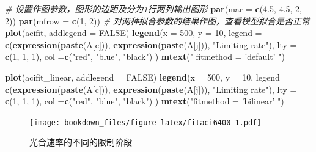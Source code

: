 \documentclass[]{krantz}
\makeatletter
\newenvironment{Shaded}{\begin{snugshade}}{\end{snugshade}}
\newcommand{\KeywordTok}[1]{\textcolor[rgb]{0.13,0.29,0.53}{\textbf{#1}}}
\newcommand{\DataTypeTok}[1]{\textcolor[rgb]{0.13,0.29,0.53}{#1}}
\newcommand{\DecValTok}[1]{\textcolor[rgb]{0.00,0.00,0.81}{#1}}
\newcommand{\FloatTok}[1]{\textcolor[rgb]{0.00,0.00,0.81}{#1}}
\newcommand{\StringTok}[1]{\textcolor[rgb]{0.31,0.60,0.02}{#1}}
\newcommand{\CommentTok}[1]{\textcolor[rgb]{0.56,0.35,0.01}{\textit{#1}}}
\newcommand{\OtherTok}[1]{\textcolor[rgb]{0.56,0.35,0.01}{#1}}
\newcommand{\NormalTok}[1]{#1}
\newenvironment{kframe}{%
\medskip{}
\setlength{\fboxsep}{.8em}
 \def\at@end@of@kframe{}%
 \ifinner\ifhmode%
  \def\at@end@of@kframe{\end{minipage}}%
  \begin{minipage}{\columnwidth}%
 \fi\fi%
 \def\FrameCommand##1{\hskip\@totalleftmargin \hskip-\fboxsep
 \colorbox{shadecolor}{##1}\hskip-\fboxsep
     \hskip-\linewidth \hskip-\@totalleftmargin \hskip\columnwidth}%
 \MakeFramed {\advance\hsize-\width
   \@totalleftmargin\z@ \linewidth\hsize
   \@setminipage}}%
 {\par\unskip\endMakeFramed%
 \at@end@of@kframe}
\renewenvironment{Shaded}{\begin{kframe}}{\end{kframe}}
\theoremstyle{definition}
\theoremstyle{definition}
\theoremstyle{definition}
\theoremstyle{remark}
\makeatother
\begin{document}
\begin{Shaded}
\begin{Highlighting}[]
\CommentTok{# 设置作图参数，图形的边距及分为1行两列输出图形}
\KeywordTok{par}\NormalTok{(}\DataTypeTok{mar =} \KeywordTok{c}\NormalTok{(}\FloatTok{4.5}\NormalTok{, }\FloatTok{4.5}\NormalTok{, }\DecValTok{2}\NormalTok{, }\DecValTok{2}\NormalTok{))}
\KeywordTok{par}\NormalTok{(}\DataTypeTok{mfrow =} \KeywordTok{c}\NormalTok{(}\DecValTok{1}\NormalTok{, }\DecValTok{2}\NormalTok{))}
\CommentTok{# 对两种拟合参数的结果作图，查看模型拟合是否正常}
\KeywordTok{plot}\NormalTok{(acifit, }\DataTypeTok{addlegend =} \OtherTok{FALSE}\NormalTok{)}
\KeywordTok{legend}\NormalTok{(}\DataTypeTok{x =} \DecValTok{500}\NormalTok{, }\DataTypeTok{y =} \DecValTok{10}\NormalTok{, }
       \DataTypeTok{legend =} \KeywordTok{c}\NormalTok{(}\KeywordTok{expression}\NormalTok{(}\KeywordTok{paste}\NormalTok{(A[c])), }
                \KeywordTok{expression}\NormalTok{(}\KeywordTok{paste}\NormalTok{(A[j])),}
                \StringTok{"Limiting rate"}\NormalTok{),}
       \DataTypeTok{lty =} \KeywordTok{c}\NormalTok{(}\DecValTok{1}\NormalTok{, }\DecValTok{1}\NormalTok{, }\DecValTok{1}\NormalTok{),}
       \DataTypeTok{col =}\KeywordTok{c}\NormalTok{(}\StringTok{"red"}\NormalTok{, }\StringTok{"blue"}\NormalTok{, }\StringTok{"black"}\NormalTok{) }
\NormalTok{         )}
\KeywordTok{mtext}\NormalTok{(}\StringTok{" fitmethod = 'default' "}\NormalTok{)}

\KeywordTok{plot}\NormalTok{(acifit_linear, }\DataTypeTok{addlegend =} \OtherTok{FALSE}\NormalTok{)}
\KeywordTok{legend}\NormalTok{(}\DataTypeTok{x =} \DecValTok{500}\NormalTok{, }\DataTypeTok{y =} \DecValTok{10}\NormalTok{, }
       \DataTypeTok{legend =} \KeywordTok{c}\NormalTok{(}\KeywordTok{expression}\NormalTok{(}\KeywordTok{paste}\NormalTok{(A[c])), }
                  \KeywordTok{expression}\NormalTok{(}\KeywordTok{paste}\NormalTok{(A[j])),}
                  \StringTok{"Limiting rate"}\NormalTok{),}
       \DataTypeTok{lty =} \KeywordTok{c}\NormalTok{(}\DecValTok{1}\NormalTok{, }\DecValTok{1}\NormalTok{, }\DecValTok{1}\NormalTok{),}
       \DataTypeTok{col =}\KeywordTok{c}\NormalTok{(}\StringTok{"red"}\NormalTok{, }\StringTok{"blue"}\NormalTok{, }\StringTok{"black"}\NormalTok{) }
\NormalTok{)}
\KeywordTok{mtext}\NormalTok{(}\StringTok{"fitmethod = 'bilinear' "}\NormalTok{)}
\end{Highlighting}
\end{Shaded}

\begin{figure}
\centering
\texttt{[image: bookdown\_files/figure-latex/fitaci6400-1.pdf]}
\caption{\label{fig:fitaci6400}光合速率的不同的限制阶段}
\end{figure}
\end{document}
